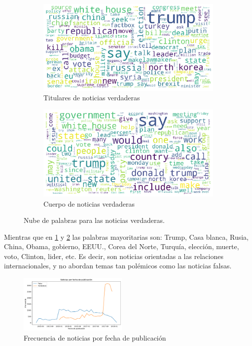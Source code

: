 {\begin{figure}
\centering
\begin{subfigure}{\escala\textwidth}
    \centering
    \includegraphics[width=\textwidth]{imagenes/wordcloud_titulares_verdaderas.pdf}
    \caption{Titulares de noticias verdaderas}
    \label{fig:tit-true}
\end{subfigure}%
\newline
\begin{subfigure}{\escala\textwidth}
    \centering
    \includegraphics[width=\textwidth]{imagenes/wordclouds_cuerpo_verdaderas.pdf}
    \caption{Cuerpo de noticias verdaderas}
    \label{fig:text-true}
\end{subfigure}
\caption{Nube de palabras para las noticias verdaderas.}
\label{fig:true}
\end{figure}
Mientras que en \ref{fig:tit-true} y \ref{fig:text-true} las palabras mayoritarias son: Trump, Casa blanca, Rusia, China, Obama, gobierno, EEUU., Corea del Norte, Turquía, elección, muerte, voto, Clinton, lider, etc. Es decir, son noticias orientadas a las relaciones internacionales, y no abordan temas tan polémicos como las noticias falsas. 


\begin{figure}
    \centering
    \includegraphics[width=0.47\textwidth]{imagenes/noticias_fecha_publicacion.pdf}
    \caption{Frecuencia de noticias por fecha de publicación}
    \label{fig:not-fecha-pub}
\end{figure}

}

